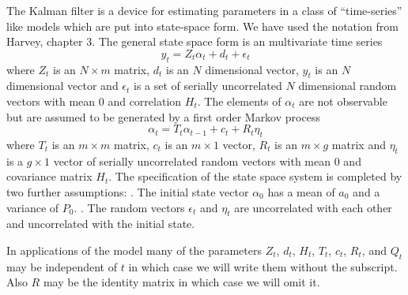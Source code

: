 %
\def\aone{a_{t|t-1}}
\def\Pone{P_{t|t-1}}

The Kalman filter is a device for estimating parameters in
a class of ``time-series'' like models which are put into state-space
form. We have used the 
notation from Harvey, chapter 3.
The general state space form is an  multivariate time series
$$y_t=Z_t\alpha_t+d_t+\epsilon_t$$ 
where $Z_t$ is an $N\times m$ matrix, $d_t$ is an $N$ dimensional
vector, $y_t$ is an $N$ dimensional vector and $\epsilon_t$ is
a set of serially uncorrelated $N$ dimensional random vectors 
with mean $0$ and correlation $H_t$.
The elements of $\alpha_t$ are not observable but are
assumed to be generated by a first order Markov process
$$\alpha_t=T_t\alpha_{t-1}+c_t+R_t\eta_t$$
where $T_t$ is an $m\times m$ matrix, $c_t$ is an $m\times 1$
vector, $R_t$ is an $m\times g$ matrix and $\eta_t$
is a $g\times 1$ vector of serially uncorrelated 
random vectors with mean $0$ and covariance matrix $H_t$.
The specification of the state space system is completed by
two further assumptions:
. The initial state vector $\alpha_0$ has a mean of $a_0$ and a 
variance of $P_0$.
. The random vectors $\epsilon_t$ and $\eta_t$ are uncorrelated
with each other and uncorrelated with the initial state.

In applications of the model many of the
parameters $Z_t$, $d_t$, $H_t$, $T_t$, $c_t$, $R_t$, and $Q_t$
may be independent of $t$ in which case we will write them
without the subscript. Also $R$ may be the identity matrix
in which case we will omit it.

